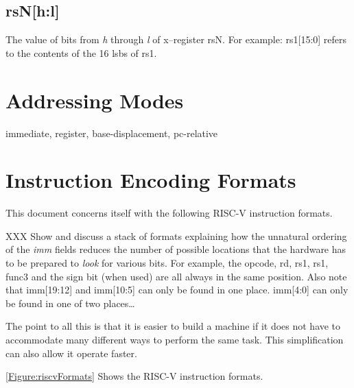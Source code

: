 \subsection{rsN[h:l]}

The value of bits from {\em h} through {\em l} of x--register rsN.
For example: rs1[15:0] refers to the contents of 
the 16 \acrshort{lsb}s of rs1.


\section{Addressing Modes}

immediate, register, base-displacement, pc-relative


\section{Instruction Encoding Formats}
\label{section:EncodingFormats}

This 
document concerns itself with the following RISC-V instruction formats.

XXX Show and discuss a stack of formats explaining how the unnatural ordering
of the {\em imm} fields reduces the number of possible locations that 
the hardware has to be prepared to {\em look} for various bits.  For example,
the opcode, rd, rs1, rs1, func3 and the sign bit (when used) are all always 
in the same position.  Also note that imm[19:12] and imm[10:5] can only be 
found in one place.  imm[4:0] can only be found in one of two places\ldots

The point to all this is that it is easier to build a machine if it 
does not have to accommodate many different ways to perform the same task.
This simplification can also allow it operate faster.

\autoref{Figure:riscvFormats} Shows the RISC-V instruction formats.

\begin{figure}[ht]
\\
\\
\\
\\
\\
\\
\label{Figure:riscvFormats}
\end{figure}

